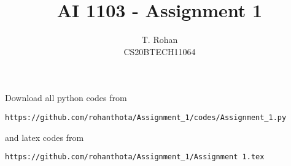 \documentclass[journal,12pt,twocolumn]{IEEEtran}
\DeclareMathOperator*{\Res}{Res}
\begin{document}
\newcommand{\BEQA}{\begin{eqnarray}}
\newcommand{\EEQA}{\end{eqnarray}}
\newcommand{\define}{\stackrel{\triangle}{=}}

\raggedbottom
\setlength{\parindent}{0pt}
\providecommand{\mbf}{\mathbf}
\providecommand{\pr}[1]{\ensuremath{\Pr\left(#1\right)}}
\providecommand{\qfunc}[1]{\ensuremath{Q\left(#1\right)}}
\providecommand{\sbrak}[1]{\ensuremath{{}\left[#1\right]}}
\providecommand{\lsbrak}[1]{\ensuremath{{}\left[#1\right.}}
\providecommand{\rsbrak}[1]{\ensuremath{{}\left.#1\right]}}
\providecommand{\brak}[1]{\ensuremath{\left(#1\right)}}
\providecommand{\lbrak}[1]{\ensuremath{\left(#1\right.}}
\providecommand{\rbrak}[1]{\ensuremath{\left.#1\right)}}
\providecommand{\cbrak}[1]{\ensuremath{\left\{#1\right\}}}
\providecommand{\lcbrak}[1]{\ensuremath{\left\{#1\right.}}
\providecommand{\rcbrak}[1]{\ensuremath{\left.#1\right\}}}
\theoremstyle{remark}
\newtheorem{rem}{Remark}
\newcommand{\sgn}{\mathop{\mathrm{sgn}}}
\providecommand{\abs}[1]{\vert#1\vert}
\providecommand{\res}[1]{\Res\displaylimits_{#1}} 
\providecommand{\norm}[1]{\lVert#1\rVert}
\providecommand{\mtx}[1]{\mathbf{#1}}
\providecommand{\mean}[1]{E[ #1 ]}
\providecommand{\fourier}{\overset{\mathcal{F}}{ \rightleftharpoons}}
\providecommand{\system}{\overset{\mathcal{H}}{ \longleftrightarrow}}
\newcommand{\solution}{\noindent \textbf{Solution: }}
\newcommand{\cosec}{\,\text{cosec}\,}
\providecommand{\dec}[2]{\ensuremath{\overset{#1}{\underset{#2}{\gtrless}}}}
\newcommand{\myvec}[1]{\ensuremath{\begin{pmatrix}#1\end{pmatrix}}}
\newcommand{\mydet}[1]{\ensuremath{\begin{vmatrix}#1\end{vmatrix}}}
\makeatletter
{}
\makeatother
\let\StandardTheFigure\thefigure
\let\vec\mathbf
\renewcommand{\thefigure}{\theproblem}
\def\putbox#1#2#3{\makebox[0in][l]{\makebox[#1][l]{}\raisebox{\baselineskip}[0in][0in]{\raisebox{#2}[0in][0in]{#3}}}}
     \def\rightbox#1{\makebox[0in][r]{#1}}
     \def\centbox#1{\makebox[0in]{#1}}
     \def\topbox#1{\raisebox{-\baselineskip}[0in][0in]{#1}}
     \def\midbox#1{\raisebox{-0.5\baselineskip}[0in][0in]{#1}}
\vspace{3cm}
\title{\textbf{AI 1103 - Assignment 1}}
\author{T. Rohan \\ CS20BTECH11064}
\maketitle
\newpage
\bigskip
\renewcommand{\thefigure}{\theenumi}
\renewcommand{\thetable}{\theenumi}
Download all python codes from 
\begin{lstlisting}
https://github.com/rohanthota/Assignment_1/codes/Assignment_1.py
\end{lstlisting}
%
and latex codes from
%
\begin{lstlisting}
https://github.com/rohanthota/Assignment_1/Assignment 1.tex
\end{lstlisting}
\end{document}
